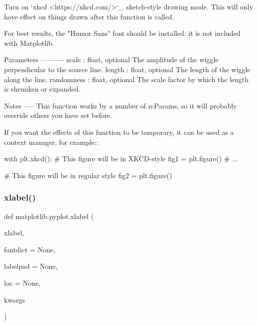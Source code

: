 \begin{DoxyVerb}Turn on `xkcd <https://xkcd.com/>`_ sketch-style drawing mode.  This will
only have effect on things drawn after this function is called.

For best results, the "Humor Sans" font should be installed: it is
not included with Matplotlib.

Parameters
----------
scale : float, optional
    The amplitude of the wiggle perpendicular to the source line.
length : float, optional
    The length of the wiggle along the line.
randomness : float, optional
    The scale factor by which the length is shrunken or expanded.

Notes
-----
This function works by a number of rcParams, so it will probably
override others you have set before.

If you want the effects of this function to be temporary, it can
be used as a context manager, for example::

    with plt.xkcd():
        # This figure will be in XKCD-style
        fig1 = plt.figure()
        # ...

    # This figure will be in regular style
    fig2 = plt.figure()
\end{DoxyVerb}
 \mbox{\label{namespacematplotlib_1_1pyplot_a38cb865b515abcc18d40da5248b45c57}} 
\subsubsection{\texorpdfstring{xlabel()}{xlabel()}}
{\footnotesize\ttfamily def matplotlib.\+pyplot.\+xlabel (\begin{DoxyParamCaption}\item[{}]{xlabel,  }\item[{}]{fontdict = {\ttfamily None},  }\item[{}]{labelpad = {\ttfamily None},  }\item[{}]{loc = {\ttfamily None},  }\item[{}]{kwargs }\end{DoxyParamCaption})}

\mbox{\label{namespacematplotlib_1_1pyplot_aae2976660d4fc607b7c31e486f856f30}} 
